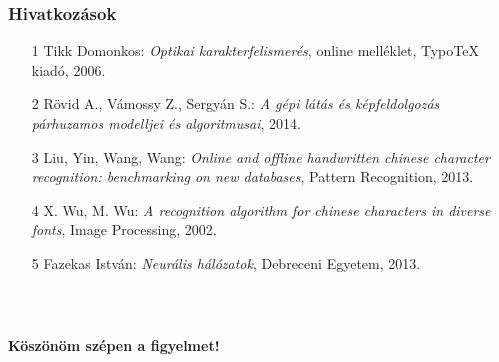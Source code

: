 \documentclass{beamer}
\begin{document}
\begin{frame}[fragile]
\frametitle{Hivatkozások}


\begin{itemize}

\item[1] Tikk Domonkos: \textit{Optikai karakterfelismerés}, online melléklet, TypoTeX kiadó, 2006.

\smallskip

\item[2] Rövid A., Vámossy Z., Sergyán S.: \textit{A gépi látás és képfeldolgozás párhuzamos modelljei és algoritmusai}, 2014.

\smallskip

\item[3] Liu, Yin, Wang, Wang: \textit{Online and offline handwritten chinese character recognition: benchmarking on new databases}, Pattern Recognition, 2013.

\smallskip

\item[4] X. Wu, M. Wu: \textit{A recognition algorithm for chinese characters in diverse fonts}, Image Processing, 2002.

\smallskip

\item[5] Fazekas István: \textit{Neurális hálózatok}, Debreceni Egyetem, 2013.

\end{itemize}


\end{frame}

\begin{frame}[fragile]
    \frametitle{\ }

\begin{center}
\Large \textbf{Köszönöm szépen a figyelmet!}
\end{center}

\end{frame}
\end{document}
